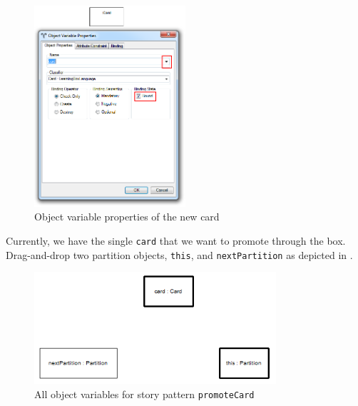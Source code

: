 \begin{stepbystep}
\begin{figure}[htbp]
\begin{center}
  \includegraphics[width=0.5\textwidth]{../../org.moflon.doc.handbook.03_storyDiagrams/04_checkCard/visCheImages/ea_addBoundObj}
  \caption{Object variable properties of the new card}
  \label{ea:sdm_new_card_properties}
\end{center}
\end{figure}

\vspace{0.5cm}

\item Currently, we have the single \texttt{card} that we want to promote through the box. Drag-and-drop two partition objects,
\texttt{this}, and \texttt{next\-Part\-it\-ion} as depicted in .

\vspace{0.5cm}

\begin{figure}[htbp]
\begin{center}
  \includegraphics[width=0.8\textwidth]{../../org.moflon.doc.handbook.03_storyDiagrams/04_checkCard/visCheImages/ea_promoteCardVariables}
  \caption{All object variables for story pattern \texttt{promoteCard}}
  \label{ea:sdm_check_complete_sp}
\end{center}
\end{figure}


\end{stepbystep}

